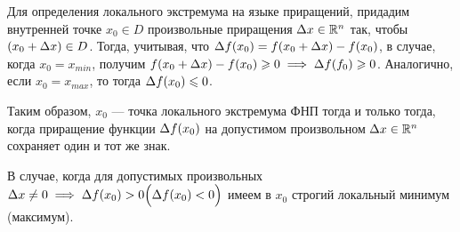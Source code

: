\documentclass[../../main.tex]{subfiles}
\begin{document}
	Для определения локального экстремума на языке приращений,
	придадим внутренней точке $x_0 \in D$
	произвольные приращения $\Delta x \in \mathbb{R}^n$ так,
	чтобы $(x_0 + \Delta x) \in D$.
	Тогда, учитывая, что $\Delta f (x_0)
	= f (x_0 + \Delta x) - f (x_0)$,
	в случае, когда $x_0 = x_{min}$, получим
	$f (x_0 + \Delta x) - f (x_0) \geqslant 0
	\implies
	\Delta f (f_0) \geqslant 0$.
	Аналогично, если $x_0 = x_{max}$,
	то тогда $\Delta f (x_0) \leqslant 0$.

	Таким образом, $x_0$ --- точка локального экстремума ФНП
	тогда и только тогда, когда
	приращение функции $\Delta f (x_0)$ на допустимом
	произвольном $\Delta x \in \mathbb{R}^n$ сохраняет один и тот же знак.
	
	В случае, когда для допустимых произвольных $\Delta x \ne 0 \implies
	\Delta f (x_0) > 0 \displaystyle
	\Big(\Delta f (x_0) < 0\Big)$
	имеем в $x_0$ строгий локальный минимум (максимум).
	
\end{document}
